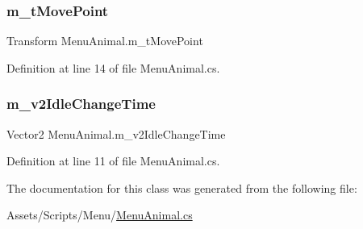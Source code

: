 \subsubsection{\texorpdfstring{m\+\_\+t\+Move\+Point}{m\_tMovePoint}}
{\footnotesize\ttfamily Transform Menu\+Animal.\+m\+\_\+t\+Move\+Point}



Definition at line 14 of file Menu\+Animal.\+cs.

\mbox{\label{class_menu_animal_ad9a9374b6b22d367c2bd03ec1975803f}} 
\subsubsection{\texorpdfstring{m\+\_\+v2\+Idle\+Change\+Time}{m\_v2IdleChangeTime}}
{\footnotesize\ttfamily Vector2 Menu\+Animal.\+m\+\_\+v2\+Idle\+Change\+Time}



Definition at line 11 of file Menu\+Animal.\+cs.



The documentation for this class was generated from the following file\+:\begin{DoxyCompactItemize}
\item 
Assets/\+Scripts/\+Menu/\mbox{\hyperlink{_menu_animal_8cs}{Menu\+Animal.\+cs}}\end{DoxyCompactItemize}
